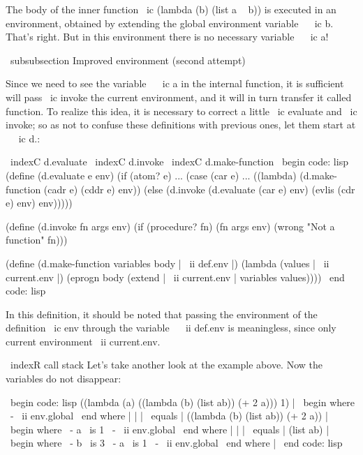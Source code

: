 {{The body of the inner function \ ic {(lambda (b) (list a ~ b))} is executed in an environment,
obtained by extending the global environment variable ~ \ ic {b}. That's right. But
in this environment there is no necessary variable ~ \ ic {a}!


\ subsubsection {Improved environment (second attempt)}

Since we need to see the variable ~ \ ic {a} in the internal function, it is sufficient
will pass \ ic {invoke} the current environment, and it will in turn transfer it
called function. To realize this idea, it is necessary to correct a little
\ ic {evaluate} and \ ic {invoke}; so as not to confuse these definitions with previous ones,
let them start at ~ \ ic {d.}:

\ indexC {d.evaluate}
\ indexC {d.invoke}
\ indexC {d.make-function}
\ begin {code: lisp}
(define (d.evaluate e env)
  (if (atom? e) ...
      (case (car e)
        ...
        ((lambda) (d.make-function (cadr e) (cddr e) env))
        (else (d.invoke (d.evaluate (car e) env)
                            (evlis (cdr e) env)
                            env)))))

(define (d.invoke fn args env)
  (if (procedure? fn)
      (fn args env)
      (wrong "Not a function" fn)))

(define (d.make-function variables body | \ ii {def.env} |)
  (lambda (values ​​| \ ii {current.env} |)
    (eprogn body (extend | \ ii {current.env} | variables values))))
\ end {code: lisp}

In this definition, it should be noted that passing the environment of the definition \ ic {env}
through the variable ~ \ ii {def.env} is meaningless, since only
current environment \ ii {current.env}.

\ indexR {call stack}
Let's take another look at the example above. Now the variables
do not disappear:

\ begin {code: lisp}
((lambda (a) ((lambda (b) (list ab)) (+ 2 a))) 1) | \ begin {where}
                                                   \ -  \ ii {env.global}
                                                   \ end {where} |
| | \ equals | ((lambda (b) (list ab)) (+ 2 a)) | \ begin {where}
                                            \ - a { \ is } 1
                                            \ -  \ ii {env.global}
                                            \ end {where} |
| | \ equals | (list ab) | \ begin {where}
                     \ - b { \ is } 3
                     \ - a { \ is } 1
                     \ -  \ ii {env.global}
                     \ end {where} |
\ end {code: lisp}

}}
